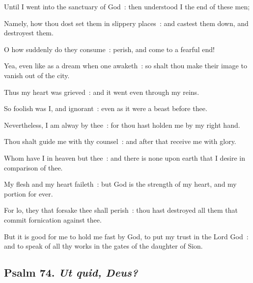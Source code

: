 Until I went into the sanctuary of God~: then understood I the end of these men;\par
{}Namely, how thou dost set them in slippery places~: and castest them down, and destroyest them.\par
{}O how suddenly do they consume~: perish, and come to a fearful end!\par
{}Yea, even like as a dream when one awaketh~: so shalt thou make their image to vanish out of the city.\par
{}Thus my heart was grieved~: and it went even through my reins.\par
{}So foolish was I, and ignorant~: even as it were a beast before thee.\par
{}Nevertheless, I am alway by thee~: for thou hast holden me by my right hand.\par
{}Thou shalt guide me with thy counsel~: and after that receive me with glory.\par
{}Whom have I in heaven but thee~: and there is none upon earth that I desire in comparison of thee.\par
{}My flesh and my heart faileth~: but God is the strength of my heart, and my portion for ever.\par
{}For lo, they that forsake thee shall perish~: thou hast destroyed all them that commit fornication against thee.\par
{}But it is good for me to hold me fast by God, to put my trust in the Lord God~: and to speak of all thy works in the gates of the daughter of Sion.\par

\clearpage
\subsection{Psalm 74. \textit{Ut quid, Deus?}}

